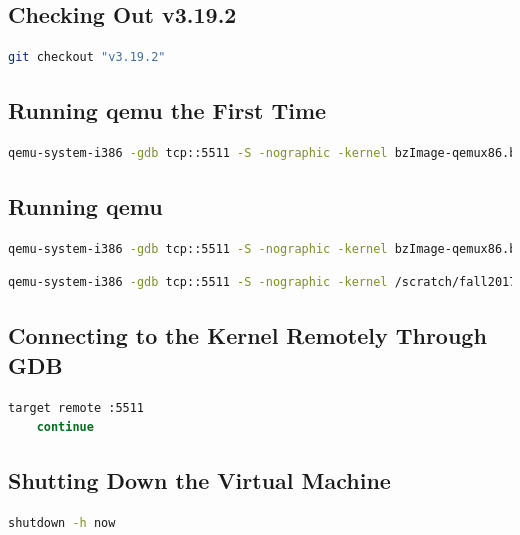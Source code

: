 \documentclass[letterpaper, onecolumn, draftclsnofoot, 10pt, compsoc]{IEEEtran}
\begin{document}
    \subsection{Checking Out v3.19.2}
    \begin{lstlisting}[language=bash]
    git checkout "v3.19.2"
    \end{lstlisting}
    
    \subsection{Running qemu the First Time}
    \begin{lstlisting}[language=bash]
    qemu-system-i386 -gdb tcp::5511 -S -nographic -kernel bzImage-qemux86.bin -drive file=core-image-lsb-sdk-qemux86.ext4,if=virtio -enable-kvm -net none -usb -localtime --no-reboot --append "root=/dev/vda rw console=ttyS0 debug"
    \end{lstlisting}
    
    \subsection{Running qemu}
    \begin{lstlisting}[language=bash, caption=Original Kernel]
    qemu-system-i386 -gdb tcp::5511 -S -nographic -kernel bzImage-qemux86.bin -drive file=core-image-lsb-sdk-qemux86.ext4,if=virtio -enable-kvm -net none -usb -localtime --no-reboot --append "root=/dev/vda rw console=ttyS0 debug"
    \end{lstlisting}
    \begin{lstlisting}[language=bash, caption=Our Kernel]
    qemu-system-i386 -gdb tcp::5511 -S -nographic -kernel /scratch/fall2017/11/group11repo/linux-yocto-3.19/arch/x86/boot/bzImage -drive file=/scratch/fall2017/11/common/core-image-lsb-sdk-qemux86.ext4,if=virtio -enable-kvm -net none -usb -localtime --no-reboot --append "root=/dev/vda rw console=ttyS0 debug"
    \end{lstlisting}
    
    \subsection{Connecting to the Kernel Remotely Through GDB}
    \begin{lstlisting}[language=bash]
    target remote :5511
    continue
    \end{lstlisting}
    
    \subsection{Shutting Down the Virtual Machine}
    \begin{lstlisting}[language=bash]
    shutdown -h now 
    \end{lstlisting}
    
\end{document}
